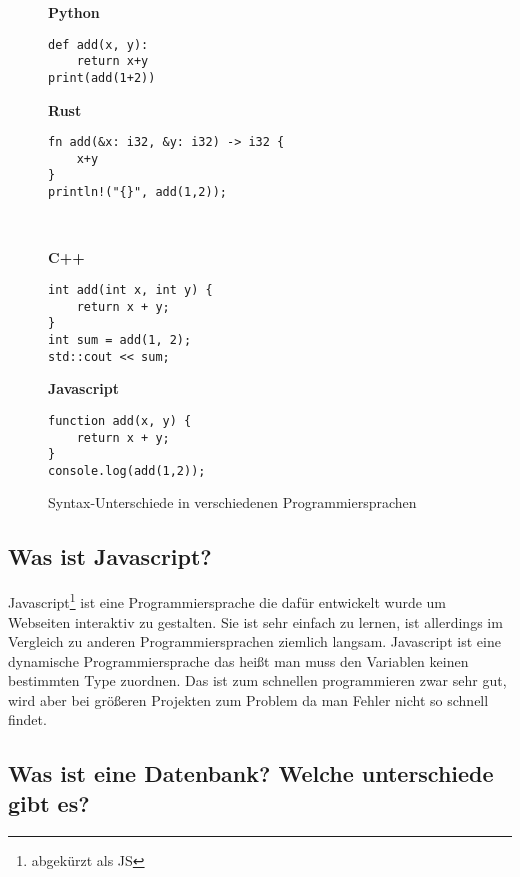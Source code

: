 \documentclass[a4paper, ngerman, 12pt]{scrartcl}
\begin{document}
\begin{figure}[ht]
\begin{minipage}{0.42\textwidth}
\textbf{Python}
\begin{verbatim}
def add(x, y):
    return x+y
print(add(1+2))
\end{verbatim}

\end{minipage}
\begin{minipage}{0.57\textwidth}
\textbf{Rust}
\begin{verbatim}
fn add(&x: i32, &y: i32) -> i32 {
    x+y
}
println!("{}", add(1,2));
\end{verbatim}
\end{minipage}\\[5mm]
\begin{minipage}{0.42\textwidth}

\textbf{C++}
\begin{verbatim}
int add(int x, int y) {
    return x + y;
}
int sum = add(1, 2);
std::cout << sum;
\end{verbatim}
\end{minipage}
\begin{minipage}{0.5\textwidth}
\textbf{Javascript}
\begin{verbatim}
function add(x, y) {
    return x + y;
}
console.log(add(1,2));
\end{verbatim}
\end{minipage}

\caption{Syntax-Unterschiede in verschiedenen Programmiersprachen\label{abb:syntax}}
\end{figure}

\subsection{Was ist Javascript?}

Javascript\footnote{abgekürzt als JS} ist eine Programmiersprache die dafür entwickelt wurde um Webseiten interaktiv zu gestalten.
Sie ist sehr einfach zu lernen, ist allerdings im Vergleich zu anderen Programmiersprachen ziemlich langsam.
Javascript ist eine dynamische Programmiersprache das heißt man muss den Variablen keinen bestimmten Type zuordnen.
Das ist zum schnellen programmieren zwar sehr gut, wird aber bei größeren Projekten zum Problem da man Fehler nicht so schnell findet.

\subsection[Wo ist Datenbank? (Sql vs NoSql)]{Was ist eine Datenbank? Welche unterschiede gibt es?}
\end{document}
